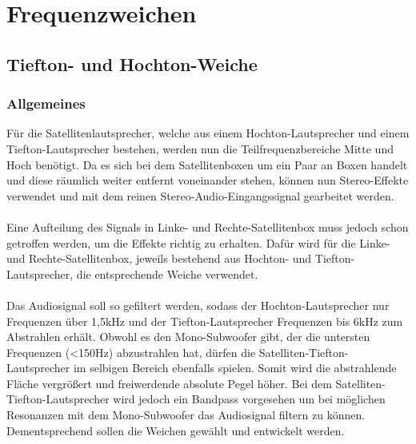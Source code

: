 \newpage
\section{Frequenzweichen}

\subsection*{Tiefton- und Hochton-Weiche}\label{sec:4.3}
\subsubsection{Allgemeines}\label{subsec:4.3.1}
Für die Satellitenlautsprecher, welche aus einem Hochton-Lautsprecher und einem Tiefton-Lautsprecher bestehen, werden nun die Teilfrequenzbereiche Mitte und Hoch benötigt.
Da es sich bei dem Satellitenboxen um ein Paar an Boxen handelt und diese räumlich weiter entfernt voneinander stehen, können nun Stereo-Effekte verwendet und mit dem reinen Stereo-Audio-Eingangssignal gearbeitet werden.
\\ \\
Eine Aufteilung des Signals in Linke- und Rechte-Satellitenbox muss jedoch schon getroffen werden, um die Effekte richtig zu erhalten.
Dafür wird für die Linke- und Rechte-Satellitenbox, jeweils bestehend aus Hochton- und Tiefton-Lautsprecher, die entsprechende Weiche verwendet.
\\ \\
Das Audiosignal soll so gefiltert werden, sodass der Hochton-Lautsprecher nur Frequenzen über 1,5kHz und der Tiefton-Lautsprecher Frequenzen bis 6kHz zum Abstrahlen erhält.
Obwohl es den Mono-Subwoofer gibt, der die untersten Frequenzen (<150Hz) abzustrahlen hat, dürfen die Satelliten-Tiefton-Lautsprecher im selbigen Bereich ebenfalls spielen.
Somit wird die abstrahlende Fläche vergrößert und freiwerdende absolute Pegel höher.
Bei dem Satelliten-Tiefton-Lautsprecher wird jedoch ein Bandpass vorgesehen um bei möglichen Resonanzen mit dem Mono-Subwoofer das Audiosignal filtern zu können.
\\
Dementsprechend sollen die Weichen gewählt und entwickelt werden.
\\

